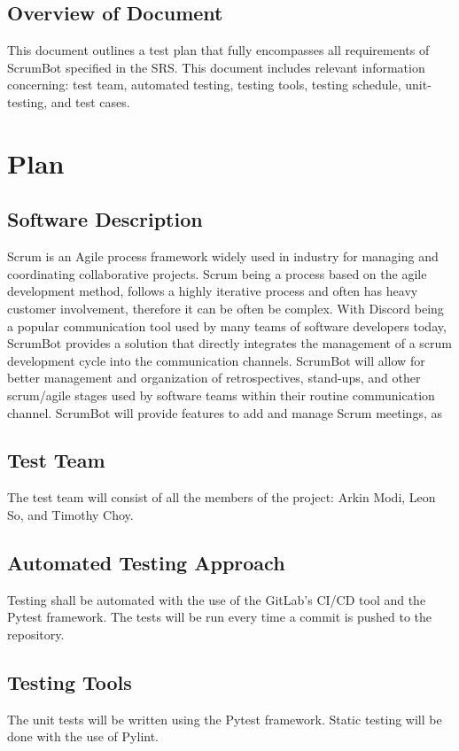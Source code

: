 \documentclass[12pt, titlepage]{article}
\begin{document}
\subsection{Overview of Document}
This document outlines a test plan that fully encompasses all requirements of ScrumBot specified in the SRS. This document includes relevant information concerning: test team, automated testing, testing tools, testing schedule, unit-testing, and test cases.

\section{Plan}
\subsection{Software Description}
Scrum is an Agile process framework widely used in industry for managing and coordinating collaborative projects. Scrum being a process based on the agile development method, follows a highly iterative process and often has heavy customer involvement, therefore it can be often be complex. With Discord being a popular communication tool used by many teams of software developers today, ScrumBot provides a solution that directly integrates the management of a scrum development cycle into the communication channels. ScrumBot will allow for better management and organization of retrospectives, stand-ups, and other scrum/agile stages used by software teams within their routine communication channel. ScrumBot will provide features to add and manage Scrum meetings, as

\subsection{Test Team}
The test team will consist of all the members of the project: Arkin Modi, Leon So, and Timothy Choy.

\subsection{Automated Testing Approach}
Testing shall be automated with the use of the GitLab's CI/CD tool and the Pytest framework. The tests will be run every time a commit is pushed to the repository.

\subsection{Testing Tools}
The unit tests will be written using the Pytest framework. Static testing will be done with the use of Pylint.
\end{document}
